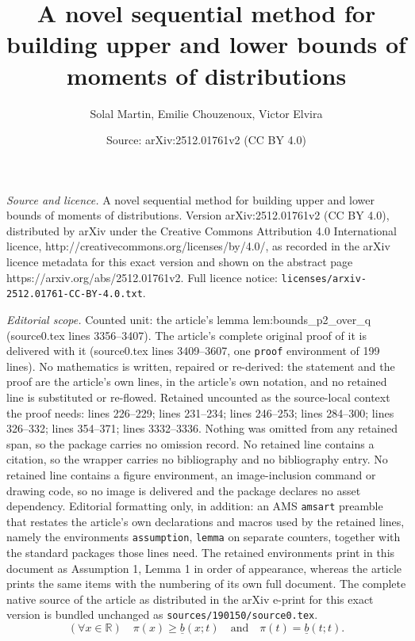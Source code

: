 \documentclass[10pt,a4paper]{amsart}
\title{A novel sequential method for building upper and lower bounds of moments of distributions}
\author{Solal Martin, Emilie Chouzenoux, Victor Elvira}
\date{Source: arXiv:2512.01761v2 (CC BY 4.0)}
\newcommand{\bR}{\mathbb{R}}
\begin{document}
\maketitle

\noindent\emph{Source and licence.} A novel sequential method for building upper and lower bounds of moments of distributions. Version arXiv:2512.01761v2 (CC BY 4.0), distributed by arXiv under the Creative Commons Attribution 4.0 International licence, http://creativecommons.org/licenses/by/4.0/, as recorded in the arXiv licence metadata for this exact version and shown on the abstract page https://arxiv.org/abs/2512.01761v2. Full licence notice: \texttt{licenses/arxiv-2512.01761-CC-BY-4.0.txt}.\par\smallskip

\noindent\textit{Editorial scope.} Counted unit: the article's lemma lem:bounds\_p2\_over\_q (source0.tex lines 3356--3407). The article's complete original proof of it is delivered with it (source0.tex lines 3409--3607, one \texttt{proof} environment of 199 lines). No mathematics is written, repaired or re-derived: the statement and the proof are the article's own lines, in the article's own notation, and no retained line is substituted or re-flowed.  Retained uncounted as the source-local context the proof needs: lines 226--229; lines 231--234; lines 246--253; lines 284--300; lines 326--332; lines 354--371; lines 3332--3336.  Nothing was omitted from any retained span, so the package carries no omission record.  No retained line contains a citation, so the wrapper carries no bibliography and no bibliography entry.  No retained line contains a figure environment, an image-inclusion command or drawing code, so no image is delivered and the package declares no asset dependency.  Editorial formatting only, in addition: an AMS \texttt{amsart} preamble that restates the article's own declarations and macros used by the retained lines, namely the environments \texttt{assumption}, \texttt{lemma} on separate counters, together with the standard packages those lines need.  The retained environments print in this document as Assumption 1, Lemma 1 in order of appearance, whereas the article prints the same items with the numbering of its own full document.  The complete native source of the article as distributed in the arXiv e-print for this exact version is bundled unchanged as \texttt{sources/190150/source0.tex}.
\begin{equation}
(\forall x \in \bR) \quad \pi(x) \geq \underline{b}(x;t) \quad \text{and} \quad \pi(t) = \underline{b}(t;t).
\label{eq_minor}
\end{equation}
\end{document}
